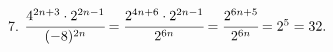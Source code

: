7. $\cfrac{4^{2n+3}\cdot 2^{2n-1}}{(-8)^{2n}}=\cfrac{2^{4n+6}\cdot 2^{2n-1}}{2^{6n}}=\cfrac{2^{6n+5}}{2^{6n}}=2^5=32.$\\
